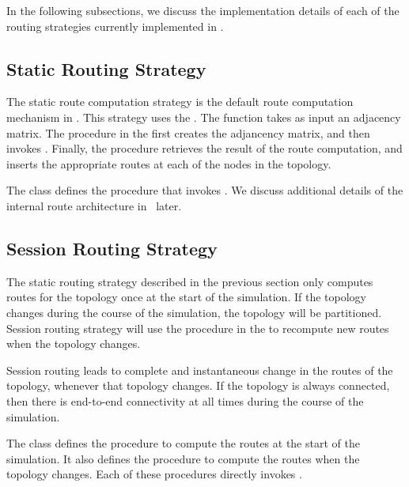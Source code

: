 \documentclass{article}
\begin{document}
In the following subsections, we discuss the implementation details
of each of the routing strategies currently implemented in \ns.

\subsection{Static Routing Strategy}
\label{sec:static}

The static route computation strategy is
the default route computation mechanism  in \ns.
This strategy uses the 
.
The function takes as input an adjacency matrix.
The procedure
in the 
first creates the adjancency matrix, and then
invokes .
Finally, the procedure retrieves the result of the route computation,
and inserts the appropriate routes at each of the nodes in the topology.

The class defines the procedure
that invokes .
We discuss additional details of the internal route architecture in \ns\ later.

\subsection{Session Routing Strategy}
\label{sec:session}

The static routing strategy described in the previous section
only computes routes for the topology once at the start of the simulation.
If the topology changes during the course of the simulation, 
the topology will be partitioned.
Session routing strategy will use the procedure
in the 
to recompute new routes when the topology changes.

Session routing leads to complete and instantaneous change
in the routes of the topology, whenever that topology changes.
If the topology is always connected, then there is
end-to-end connectivity at all times during the course of the simulation.

The class defines the procedure
to compute the routes at the start of the simulation.
It also defines the procedure
to compute the routes when the topology changes.
Each of these procedures directly invokes .
\end{document}
